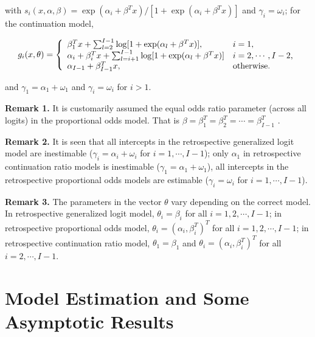 \documentclass[12]{interact}
\theoremstyle{plain}%
\theoremstyle{definition}
\theoremstyle{remark}
\begin{document}
with $s_i(x, \alpha, \beta)=\exp(\alpha_i+\beta^T x)/[1+\exp(\alpha_i+\beta^T x)]$ and $\gamma_i=\omega_i$; for the continuation model,

\begin{equation}
	g_i(x,\theta)=\left\{\begin{array}{lllll}
		$$ \beta_1^T x+\sum_{l=2}^{I-1}\log[1+\exp(\alpha_l+\beta^T x)], & i=1, $$\\
		$$\alpha_i+\beta_i^T x+\sum_{l=i+1}^{I-1}\log[1+\exp(\alpha_l+\beta^T x)] & i=2, \cdots, I-2, $$\\
		$$\alpha_{I-1}+\beta_{I-1}^T x, & \mbox{otherwise}.$$
	\end{array}
	\right. \label{gfunction_CR}
\end{equation}

and $\gamma_1=\alpha_1 + \omega_1$ and $\gamma_i=\omega_i$ for $i >1$.

\textbf{Remark 1. } It is customarily assumed the equal odds ratio parameter (across all logits) in the proportional odds model. That is $\beta=\beta^T_1= \beta^T_2=\cdots=\beta^T_{I-1}$  \citep{MCCULLAGH-OrdinalReg-Discussion-1980, ZhangBiao-AustrNZJS-2004}.

\textbf{Remark 2. } It is seen that all intercepts in the retrospective generalized logit model are inestimable ($\gamma_i=\alpha_i + \omega_i$ for $i=1, \cdots, I-1$); only $\alpha_1$ in retrospective continuation ratio models is inestimable ($\gamma_1=\alpha_1 + \omega_1$), all intercepts in the retrospective proportional odds models are estimable ($\gamma_i=\omega_i$ for $i=1, \cdots, I-1$).

\textbf{Remark 3. }  The parameters in the vector $\theta$ vary depending on the correct model. In retrospective generalized logit model, $\theta_i=\beta_i$ for all $i=1,2, \cdots, I-1$; in retrospective proportional odds model, $\theta_i=(\alpha_i,\beta_i^T)^T$ for all $i=1,2, \cdots, I-1$; in retrospective continuation ratio model, $\theta_1 = \beta_1$ and $\theta_i=(\alpha_i,\beta_i^T)^T$ for all $i=2, \cdots, I-1$. \label{model_parametrization}


\section{Model Estimation and Some Asymptotic Results}
\end{document}
